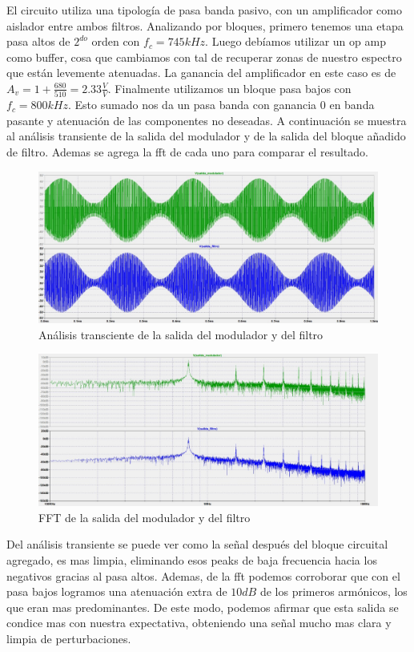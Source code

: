 El circuito utiliza una tipología de pasa banda pasivo, con un amplificador como aislador entre ambos filtros. Analizando por bloques, primero tenemos una etapa pasa altos de $2^{do}$ orden con $f_c = 745kHz$. Luego debíamos utilizar un op amp como buffer, cosa que cambiamos con tal de recuperar zonas de nuestro espectro que están levemente atenuadas. La ganancia del amplificador en este caso es de $A_v = 1 + \frac{680}{510} = 2.33\frac{V}{V}$. Finalmente utilizamos un bloque pasa bajos con $f_c=800kHz$. Esto sumado nos da un pasa banda con ganancia 0 en banda pasante y atenuación de las componentes no deseadas. A continuación se muestra al análisis transiente de la salida del modulador y de la salida del bloque añadido de filtro. Ademas se agrega la fft de cada uno para comparar el resultado.

\begin{figure}[ht!]
    \centering
    \includegraphics[width=0.75\linewidth]{img/fft.jpg}
    \caption{Análisis transciente de la salida del modulador y del filtro}
    \label{fig:Transiente}
\end{figure}

\begin{figure}[ht!]
    \centering
    \includegraphics[width=0.75\linewidth]{img/transiente.jpg}
    \caption{FFT de la salida del modulador y del filtro}
    \label{fig:FFT}
\end{figure}

Del análisis transiente se puede ver como la señal después del bloque circuital agregado, es mas limpia, eliminando esos peaks de baja frecuencia hacia los negativos gracias al pasa altos. Ademas, de la fft podemos corroborar que con el pasa bajos logramos una atenuación extra de $10dB$ de los primeros armónicos, los que eran mas predominantes. De este modo, podemos afirmar que esta salida se condice mas con nuestra expectativa, obteniendo una señal mucho mas clara y limpia de perturbaciones.